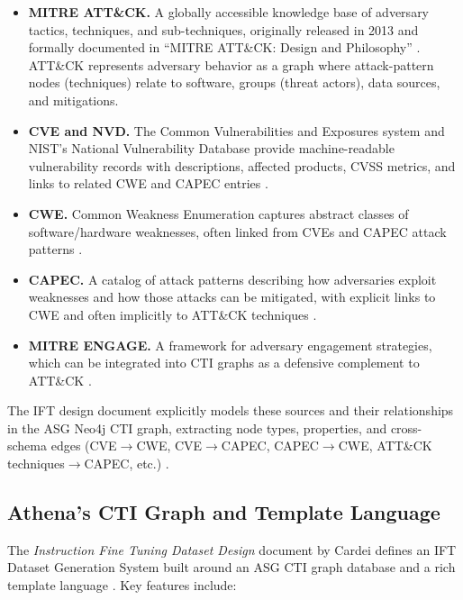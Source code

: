 \documentclass[unnumsec,webpdf,contemporary,large]{oup-authoring-template}
\theoremstyle{thmstyleone}
\theoremstyle{thmstyletwo}
\theoremstyle{thmstylethree}
\begin{document}
\begin{itemize}
  \item \textbf{MITRE ATT\&CK.} A globally accessible knowledge base of adversary tactics, techniques, and sub-techniques, originally released in 2013 and formally documented in ``MITRE ATT\&CK: Design and Philosophy'' \cite{strom2018mitreattck}. ATT\&CK represents adversary behavior as a graph where attack-pattern nodes (techniques) relate to software, groups (threat actors), data sources, and mitigations.
  \item \textbf{CVE and NVD.} The Common Vulnerabilities and Exposures system and NIST's National Vulnerability Database provide machine-readable vulnerability records with descriptions, affected products, CVSS metrics, and links to related CWE and CAPEC entries \cite{mitreCVE}.
  \item \textbf{CWE.} Common Weakness Enumeration captures abstract classes of software/hardware weaknesses, often linked from CVEs and CAPEC attack patterns \cite{mitreCWE}.
  \item \textbf{CAPEC.} A catalog of attack patterns describing how adversaries exploit weaknesses and how those attacks can be mitigated, with explicit links to CWE and often implicitly to ATT\&CK techniques \cite{mitreCAPEC}.
  \item \textbf{MITRE ENGAGE.} A framework for adversary engagement strategies, which can be integrated into CTI graphs as a defensive complement to ATT\&CK \cite{cardei2025ift}.
\end{itemize}

The IFT design document explicitly models these sources and their relationships in the ASG Neo4j CTI graph, extracting node types, properties, and cross-schema edges (CVE$\rightarrow$CWE, CVE$\rightarrow$CAPEC, CAPEC$\rightarrow$CWE, ATT\&CK techniques$\rightarrow$CAPEC, etc.) \cite{cardei2025ift}.

\subsection{Athena's CTI Graph and Template Language}

The \emph{Instruction Fine Tuning Dataset Design} document by Cardei defines an IFT Dataset Generation System built around an ASG CTI graph database and a rich template language \cite{cardei2025ift}. Key features include:
\end{document}
